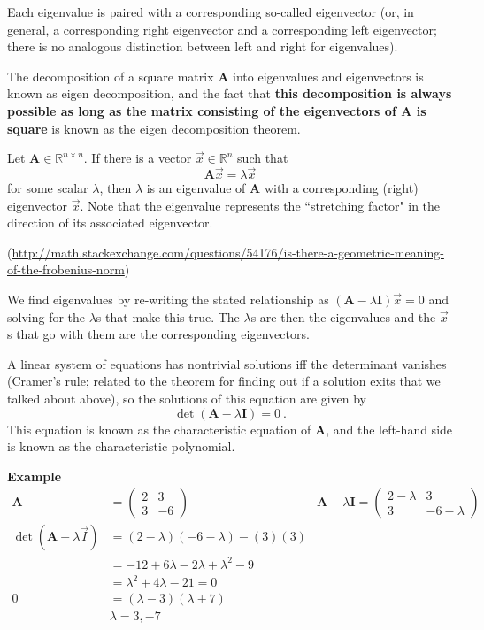 \documentclass[12pt]{article}
\newcommand{\ve}[1]{\ensuremath{\mathbf{#1}}}
\begin{document}
Each eigenvalue is paired with a corresponding so-called eigenvector (or, in general, a corresponding right eigenvector and a corresponding left eigenvector; there is no analogous distinction between left and right for eigenvalues).

The decomposition of a square matrix $\ve{A}$ into eigenvalues and eigenvectors is known as eigen decomposition, and the fact that \textbf{this decomposition is always possible as long as the matrix consisting of the eigenvectors of $\ve{A}$ is square} is known as the eigen decomposition theorem.

Let $\ve{A} \in \mathbb{R}^{n \times n}$. If there is a vector $\vec{x} \in \mathbb{R}^{n}$ such that
%
\[\ve{A} \vec{x} = \lambda \vec{x}\]
%
for some scalar $\lambda$, then $\lambda$ is an eigenvalue of $\ve{A}$ with a corresponding (right) eigenvector $\vec{x}$. Note that the eigenvalue represents the ``stretching factor" in the direction of its associated eigenvector. 

(\href{http://math.stackexchange.com/questions/54176/is-there-a-geometric-meaning-of-the-frobenius-norm}{http://math.stackexchange.com/questions/54176/is-there-a-geometric-meaning-of-the-frobenius-norm})
 
We find eigenvalues by re-writing the stated relationship as $(\ve{A} - \lambda \ve{I})\vec{x}=0$ and solving for the $\lambda$s that make this true. The $\lambda$s are then the eigenvalues and the $\vec{x}$s that go with them are the corresponding eigenvectors. 

A linear system of equations has nontrivial solutions iff the determinant vanishes (Cramer's rule; related to the theorem for finding out if a solution exits that we talked about above), so the solutions of this equation are given by
%
\[\det(\ve{A} - \lambda \ve{I})=0 \:.\] 	
%
This equation is known as the characteristic equation of $\ve{A}$, and the left-hand side is known as the characteristic polynomial.

\textbf{Example}
\begin{align}
    \ve{A} &= \begin{pmatrix}
        2 & 3 \\
        3 & -6
    \end{pmatrix} 
    &\ve{A} - \lambda \ve{I} = \begin{pmatrix}
        2 - \lambda & 3 \\
        3 & -6 - \lambda
    \end{pmatrix} \nonumber \\
%  
\det(\ve{A} - \lambda \vec{I}) &= (2 - \lambda)(-6 - \lambda) - (3)(3) \nonumber \\
%
&= -12 + 6\lambda -2\lambda + \lambda^2 -9 \nonumber \\
&= \lambda^2 + 4\lambda -21 = 0 \nonumber \\
0 &= (\lambda - 3)(\lambda + 7) \nonumber \\
&\boxed{\lambda = 3, -7} \nonumber
\end{align} 
\end{document}
